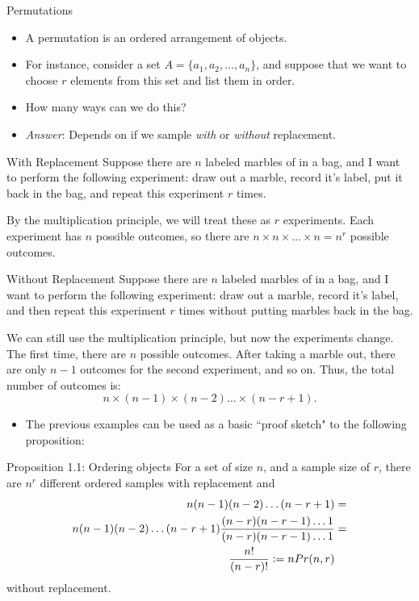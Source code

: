 \begin{frame}[allowframebreaks]{Permutations}
  
  \begin{itemize}
    \item A \alert{permutation} is an ordered arrangement of objects.
    \item For instance, consider a set $A = \{a_1, a_2, \ldots, a_n\}$, and suppose that we want to choose $r$ elements from this set and list them in order. 
    \item How many ways can we do this? 
    \item \emph{Answer}: Depends on if we sample \emph{with} or \emph{without} replacement.
  \end{itemize}
  
  \begin{block}{With Replacement}
    Suppose there are $n$ labeled marbles of in a bag, and I want to perform the following experiment: draw out a marble, record it's label, put it back in the bag, and repeat this experiment $r$ times.
    
    By the multiplication principle, we will treat these as $r$ experiments. Each experiment has $n$ possible outcomes, so there are $n \times n \times \ldots \times n = n^r$ possible outcomes.
  \end{block}
  
    \begin{block}{Without Replacement}
    Suppose there are $n$ labeled marbles of in a bag, and I want to perform the following experiment: draw out a marble, record it's label, and then repeat this experiment $r$ times without putting marbles back in the bag.
    
    We can still use the multiplication principle, but now the experiments change. The first time, there are $n$ possible outcomes. After taking a marble out, there are only $n-1$ outcomes for the second experiment, and so on. Thus, the total number of outcomes is: 
    $$n \times (n-1) \times (n-2) \ldots \times (n-r+1).$$
  \end{block}
  
  \begin{itemize}
    \item The previous examples can be used as a basic ``proof sketch" to the following proposition:
  \end{itemize}
  
  \begin{block}{Proposition 1.1: Ordering objects}
    For a set of size $n$, and a sample size of $r$, there are $n^r$ different ordered samples with replacement and
    \begin{align*}
    n(n-1)(n-2)\ldots(n-r+1) &= \\
    n(n-1)(n-2)\ldots(n-r+1)\frac{(n-r)(n-r-1)\ldots 1}{(n-r)(n-r-1)\ldots 1} &=\\
    \frac{n!}{(n-r)!} \vcentcolon= nPr(n, r) &
    \end{align*}
    without replacement.
  \end{block}
  

\end{frame}
